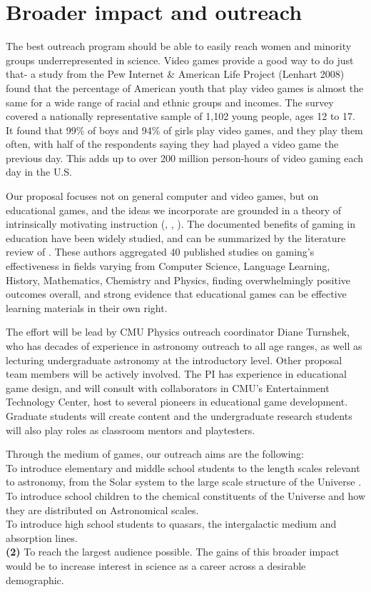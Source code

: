 \section{Broader impact and outreach}

The best outreach program should be able to easily reach women and
minority groups underrepresented in science. Video games provide
a good way to do just that- a  study from the  Pew Internet 
\& American Life 
Project (Lenhart 2008) found that the percentage of American youth
that play video games is almost the same for a wide range of racial and
ethnic groups and incomes. The survey covered a
 nationally representative sample of 1,102 young people, ages 12 to 
17. It found that 99\% of boys and 94\% of girls
play video games, and they play them often, with  half of the respondents 
saying they had played a video game the previous day. This adds up to
over 200 million person-hours of video gaming each day in the U.S.

Our proposal 
focuses not on general computer and video games, but on educational games,
and the ideas we incorporate are 
grounded in a theory of intrinsically motivating instruction 
(\citealt{Gee03},
\citealt{Squire03}, \citealt{Schell08}). The documented benefits of gaming
in education have been widely studied, and can be summarized by the 
literature review of \cite{Backlund}. These authors aggregated 40 published
studies on 
gaming's effectiveness in fields varying from Computer Science, 
Language Learning, History, Mathematics, Chemistry and Physics, finding 
overwhelmingly positive outcomes overall, and strong evidence that 
educational games can be effective learning materials in their own right.

The effort will be lead by CMU Physics outreach coordinator Diane 
Turnshek, who has decades of
experience in astronomy outreach to all age ranges, as well
as lecturing undergraduate astronomy at the introductory level.
Other proposal team members will be actively involved. The PI has
experience in educational game design, and will consult with collaborators
in CMU's Entertainment Technology Center, host to several pioneers in 
educational game development. Graduate students will create content
and the undergraduate research students will also play roles
as  classroom mentors and playtesters.




Through the medium of  games, our outreach aims are the following:\\
 To introduce  elementary and middle
school students to the length scales relevant
to astronomy, from the Solar system to the large scale structure of the Universe
.\\
  To introduce school children to the chemical constituents
 of the Universe and how they are distributed on Astronomical scales.\\
 To introduce high school students to 
 quasars, the  intergalactic medium and absorption lines.\\
{\bf (2)}
To reach the largest audience possible. 
 The gains of this broader 
impact would be to increase interest in science as a career across 
a desirable demographic.

